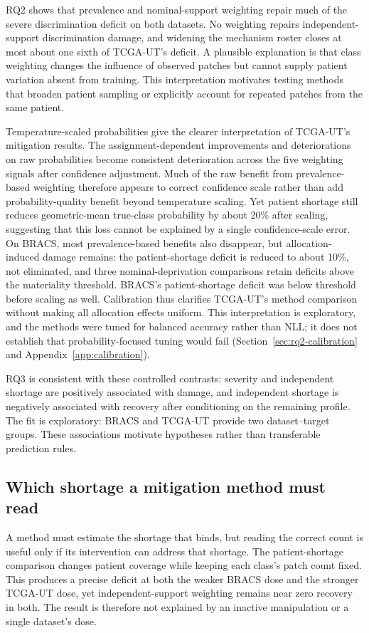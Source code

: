\documentclass[11pt]{article}
\begin{document}
RQ2 shows that prevalence and nominal-support weighting repair much of the severe discrimination deficit on both datasets. No weighting repairs independent-support discrimination damage, and widening the mechanism roster closes at most about one sixth of TCGA-UT's deficit. A plausible explanation is that class weighting changes the influence of observed patches but cannot supply patient variation absent from training. This interpretation motivates testing methods that broaden patient sampling or explicitly account for repeated patches from the same patient.

Temperature-scaled probabilities give the clearer interpretation of TCGA-UT's mitigation results. The assignment-dependent improvements and deteriorations on raw probabilities become consistent deterioration across the five weighting signals after confidence adjustment. Much of the raw benefit from prevalence-based weighting therefore appears to correct confidence scale rather than add probability-quality benefit beyond temperature scaling. Yet patient shortage still reduces geometric-mean true-class probability by about \num{20}\% after scaling, suggesting that this loss cannot be explained by a single confidence-scale error. On BRACS, most prevalence-based benefits also disappear, but allocation-induced damage remains: the patient-shortage deficit is reduced to about \num{10}\%, not eliminated, and three nominal-deprivation comparisons retain deficits above the materiality threshold. BRACS's patient-shortage deficit was below threshold before scaling as well. Calibration thus clarifies TCGA-UT's method comparison without making all allocation effects uniform. This interpretation is exploratory, and the methods were tuned for balanced accuracy rather than NLL; it does not establish that probability-focused tuning would fail (Section~\ref{sec:rq2-calibration} and Appendix~\ref{app:calibration}).

RQ3 is consistent with these controlled contrasts: severity and independent shortage are positively associated with damage, and independent shortage is negatively associated with recovery after conditioning on the remaining profile. The fit is exploratory: BRACS and TCGA-UT provide two dataset--target groups. These associations motivate hypotheses rather than transferable prediction rules.

\subsection{Which shortage a mitigation method must read}
\label{sec:discussion-signal}
A method must estimate the shortage that binds, but reading the correct count is useful only if its intervention can address that shortage. The patient-shortage comparison changes patient coverage while keeping each class's patch count fixed. This produces a precise deficit at both the weaker BRACS dose and the stronger TCGA-UT dose, yet independent-support weighting remains near zero recovery in both. The result is therefore not explained by an inactive manipulation or a single dataset's dose.
\end{document}

